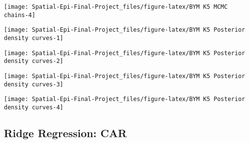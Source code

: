 \documentclass[]{article}
\begin{document}
\begin{center}\texttt{[image: Spatial-Epi-Final-Project\_files/figure-latex/BYM K5 MCMC chains-4]} \end{center}

\begin{center}\texttt{[image: Spatial-Epi-Final-Project\_files/figure-latex/BYM K5 Posterior density curves-1]} \end{center}

\begin{center}\texttt{[image: Spatial-Epi-Final-Project\_files/figure-latex/BYM K5 Posterior density curves-2]} \end{center}

\begin{center}\texttt{[image: Spatial-Epi-Final-Project\_files/figure-latex/BYM K5 Posterior density curves-3]} \end{center}

\begin{center}\texttt{[image: Spatial-Epi-Final-Project\_files/figure-latex/BYM K5 Posterior density curves-4]} \end{center}

\hypertarget{ridge-regression-car}{%
\subsection{Ridge Regression: CAR}\label{ridge-regression-car}}
\end{document}
